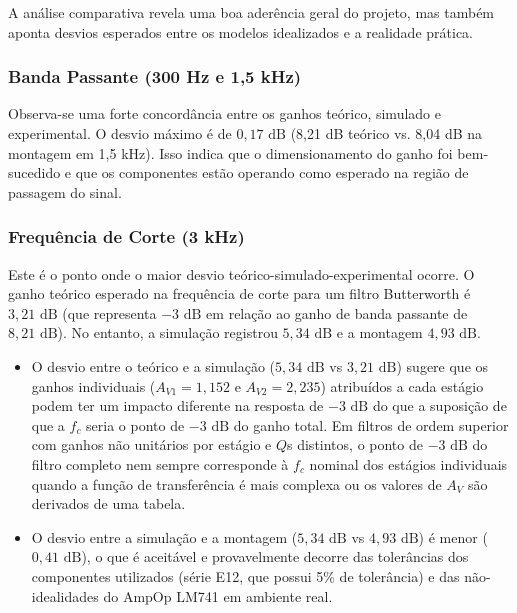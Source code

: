 A análise comparativa revela uma boa aderência geral do projeto, mas também aponta desvios esperados entre os modelos idealizados e a realidade prática.

\subsubsection{Banda Passante (300 Hz e 1,5 kHz)} Observa-se uma forte concordância entre os ganhos teórico, simulado e experimental. O desvio máximo é de $0,17 \text{ dB}$ (8,21 dB teórico vs. 8,04 dB na montagem em 1,5 kHz). Isso indica que o dimensionamento do ganho foi bem-sucedido e que os componentes estão operando como esperado na região de passagem do sinal.

\subsubsection{Frequência de Corte (3 kHz)} Este é o ponto onde o maior desvio teórico-simulado-experimental ocorre. O ganho teórico esperado na frequência de corte para um filtro Butterworth é $3,21 \text{ dB}$ (que representa $-3 \text{ dB}$ em relação ao ganho de banda passante de $8,21 \text{ dB}$). No entanto, a simulação registrou $5,34 \text{ dB}$ e a montagem $4,93 \text{ dB}$.
\begin{itemize}
    \item O desvio entre o teórico e a simulação ($5,34 \text{ dB}$ vs $3,21 \text{ dB}$) sugere que os ganhos individuais ($A_{V1}=1,152$ e $A_{V2}=2,235$) atribuídos a cada estágio podem ter um impacto diferente na resposta de $-3 \text{ dB}$ do que a suposição de que a $f_c$ seria o ponto de $-3 \text{ dB}$ do ganho total. Em filtros de ordem superior com ganhos não unitários por estágio e $Q$s distintos, o ponto de $-3 \text{ dB}$ do filtro completo nem sempre corresponde à $f_c$ nominal dos estágios individuais quando a função de transferência é mais complexa ou os valores de $A_V$ são derivados de uma tabela.
    \item O desvio entre a simulação e a montagem ($5,34 \text{ dB}$ vs $4,93 \text{ dB}$) é menor ($0,41 \text{ dB}$), o que é aceitável e provavelmente decorre das tolerâncias dos componentes utilizados (série E12, que possui 5\% de tolerância) e das não-idealidades do AmpOp LM741 em ambiente real.
\end{itemize}

